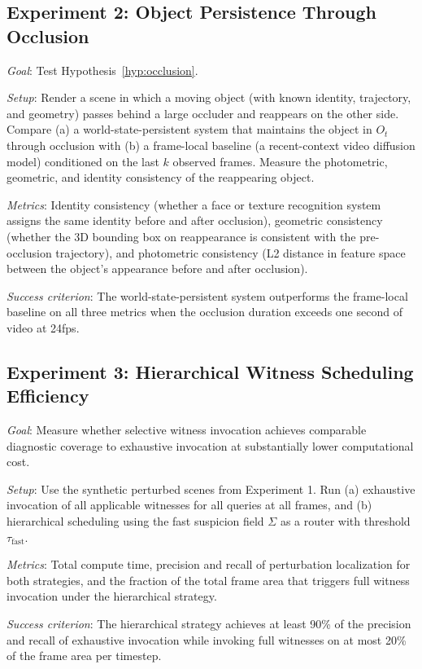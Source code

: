\documentclass[11pt,a4paper]{article}
\theoremstyle{plain}
\theoremstyle{definition}
\theoremstyle{remark}
\begin{document}
\subsection{Experiment 2: Object Persistence Through Occlusion}

\textit{Goal}: Test Hypothesis~\ref{hyp:occlusion}.

\textit{Setup}: Render a scene in which a moving object (with known identity, trajectory, and geometry) passes behind a large occluder and reappears on the other side. Compare (a) a world-state-persistent system that maintains the object in $O_t$ through occlusion with (b) a frame-local baseline (a recent-context video diffusion model) conditioned on the last $k$ observed frames. Measure the photometric, geometric, and identity consistency of the reappearing object.

\textit{Metrics}: Identity consistency (whether a face or texture recognition system assigns the same identity before and after occlusion), geometric consistency (whether the 3D bounding box on reappearance is consistent with the pre-occlusion trajectory), and photometric consistency (L2 distance in feature space between the object's appearance before and after occlusion).

\textit{Success criterion}: The world-state-persistent system outperforms the frame-local baseline on all three metrics when the occlusion duration exceeds one second of video at 24fps.

\subsection{Experiment 3: Hierarchical Witness Scheduling Efficiency}

\textit{Goal}: Measure whether selective witness invocation achieves comparable diagnostic coverage to exhaustive invocation at substantially lower computational cost.

\textit{Setup}: Use the synthetic perturbed scenes from Experiment 1. Run (a) exhaustive invocation of all applicable witnesses for all queries at all frames, and (b) hierarchical scheduling using the fast suspicion field $\Sigma$ as a router with threshold $\tau_{\mathrm{fast}}$.

\textit{Metrics}: Total compute time, precision and recall of perturbation localization for both strategies, and the fraction of the total frame area that triggers full witness invocation under the hierarchical strategy.

\textit{Success criterion}: The hierarchical strategy achieves at least 90\% of the precision and recall of exhaustive invocation while invoking full witnesses on at most 20\% of the frame area per timestep.
\end{document}
